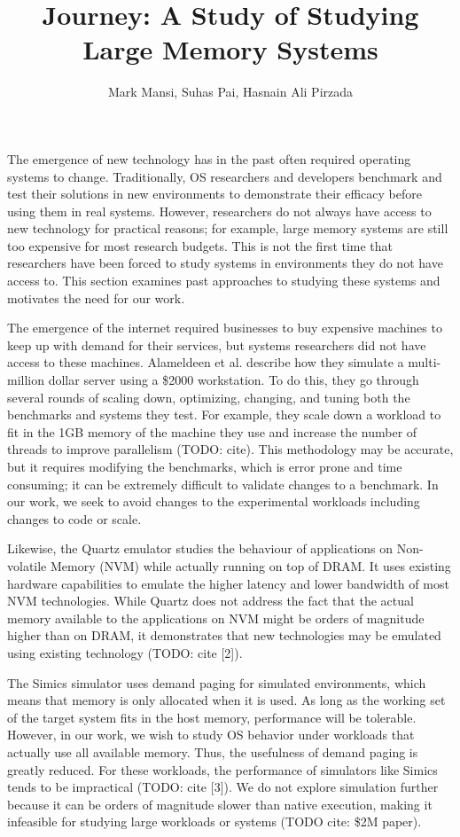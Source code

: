 \documentclass[twocolumn,11pt]{article}
\title{Journey: A Study of Studying Large Memory Systems}
\author{Mark Mansi, Suhas Pai, Hasnain Ali Pirzada}
\date{}
\begin{document}
\maketitle

The emergence of new technology has in the past often required operating
systems to change. Traditionally, OS researchers and developers benchmark and
test their solutions in new environments to demonstrate their efficacy before
using them in real systems. However, researchers do not always have access to
new technology for practical reasons; for example, large memory systems are
still too expensive for most research budgets. This is not the first time that
researchers have been forced to study systems in environments they do not have
access to. This section examines past approaches to studying these systems and
motivates the need for our work.

The emergence of the internet required businesses to buy expensive machines to
keep up with demand for their services, but systems researchers did not have
access to these machines. Alameldeen et al. describe how they simulate a
multi-million dollar server using a \$2000 workstation. To do this, they go
through several rounds of scaling down, optimizing, changing, and tuning both
the benchmarks and systems they test. For example, they scale down a workload
to fit in the 1GB memory of the machine they use and increase the number of
threads to improve parallelism (TODO: cite). This methodology may be accurate,
but it requires modifying the benchmarks, which is error prone and time
consuming; it can be extremely difficult to validate changes to a benchmark. In
our work, we seek to avoid changes to the experimental workloads including
changes to code or scale. 

Likewise, the Quartz emulator studies the behaviour of applications on
Non-volatile Memory (NVM) while actually running on top of DRAM. It uses
existing hardware capabilities to emulate the higher latency and lower
bandwidth of most NVM technologies. While Quartz does not address the fact that
the actual memory available to the applications on NVM might be orders of
magnitude higher than on DRAM, it demonstrates that new technologies may be
emulated using existing technology (TODO: cite [2]). 

The Simics simulator uses demand paging for simulated environments, which means
that memory is only allocated when it is used. As long as the working set of
the target system fits in the host memory, performance will be tolerable.
However, in our work, we wish to study OS behavior under workloads that
actually use all available memory. Thus, the usefulness of demand paging is
greatly reduced. For these workloads, the performance of simulators like Simics
tends to be impractical (TODO: cite [3]). We do not explore simulation further
because it can be orders of magnitude slower than native execution, making it
infeasible for studying large workloads or systems (TODO cite: \$2M paper).
\end{document}
